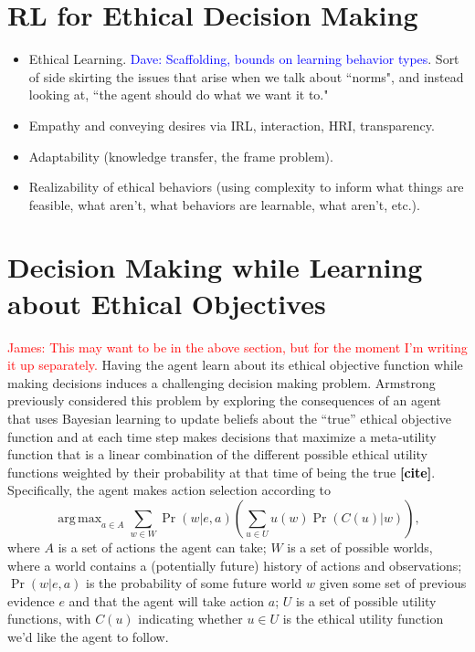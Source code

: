 \documentclass[11pt]{article}
\newcommand\davenote[1]{\textcolor{blue}{Dave: #1}}
\newcommand\jmnote[1]{\textcolor{red}{James: #1}}
\newcommand\ncite{\textcolor{black}{{\bf [cite]}}}
\DeclareMathOperator*{\argmax}{arg\,max}
\begin{document}
\section{RL for Ethical Decision Making}

\begin{itemize}
\item Ethical Learning. \davenote{Scaffolding, bounds on learning behavior types}. Sort of side skirting the issues that arise when we talk about ``norms", and instead looking at, ``the agent should do what we want it to."
\item Empathy and conveying desires via IRL, interaction, HRI, transparency.
\item Adaptability (knowledge transfer, the frame problem).
\item Realizability of ethical behaviors (using complexity to inform what things are feasible, what aren't, what behaviors are learnable, what aren't, etc.).
\end{itemize}

\section{Decision Making while Learning about Ethical Objectives}
\jmnote{This may want to be in the above section, but for the moment I'm writing it up separately.}
Having the agent learn about its ethical objective function while making decisions induces a challenging decision making problem. Armstrong previously considered this problem by exploring the consequences of an agent that uses Bayesian learning to update beliefs about the ``true'' ethical objective function and at each time step makes decisions that maximize a meta-utility function that is a linear combination of the different possible ethical utility functions weighted by their probability at that time of being the true \ncite. Specifically, the agent makes action selection according to
\begin{equation}
\label{eq:armstrong}
\argmax_{a \in A} \sum_{w \in W} \Pr(w | e, a) \left( \sum_{u \in U} u(w) \Pr(C(u)|w) \right),
\end{equation}
where $A$ is a set of actions the agent can take; $W$ is a set of possible worlds, where a world contains a (potentially future) history of actions and observations; $\Pr(w | e, a)$ is the probability of some future world $w$ given some set of previous evidence $e$ and that the agent will take action $a$; $U$ is a set of possible utility functions, with $C(u)$ indicating whether $u \in U$ is the ethical utility function we'd like the agent to follow.
\end{document}

